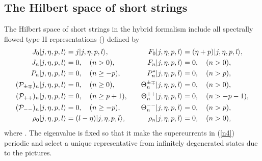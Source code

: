 \documentclass[a4paper,seceq,preprint]{ptptex}
\begin{document}
\subsection{The Hilbert space of short strings}\label{short}

The Hilbert space of short strings in the hybrid formalism include
all spectrally flowed type II representations\cite{KK} (\coordHE{})
defined by
\begin{alignat}{2}
 J_0|j,\eta,p,l\rangle&=j|j,\eta,p,l\rangle,&\qquad
 F_0|j,\eta,p,l\rangle&=(\eta+p)|j,\eta,p,l\rangle,\nonumber\\
 J_n|j,\eta,p,l\rangle&=0,\quad (n>0),&\quad
 F_n|j,\eta,p,l\rangle&=0,\quad (n>0),\nonumber\\
 P_n|j,\eta,p,l\rangle&=0,\quad (n\ge-p),&\quad
 P^*_n|j,\eta,p,l\rangle&=0,\quad (n>p),\nonumber\\
 ({\cal P}_{\pm\mp})_n|j,\eta,p,l\rangle&=0,\quad (n\ge0),&\quad
 \Theta^{\pm\mp}_n|j,\eta,p,l\rangle&=0,\quad (n>0),\nonumber\\
 ({\cal P}_{++})_n|j,\eta,p,l\rangle&=0,\quad (n\ge p+1),&\quad
 \Theta^{++}_n|j,\eta,p,l\rangle&=0,\quad (n>-p-1),\nonumber\\
 ({\cal P}_{--})_n|j,\eta,p,l\rangle&=0,\quad (n\ge-p),&\quad
 \Theta^{--}_n|j,\eta,p,l\rangle&=0,\quad (n>p),\nonumber\\
 \rho_0|j,\eta,p,l\rangle&=(l-\eta)|j,\eta,p,l\rangle,&\quad
 \rho_n|j,\eta,p,l\rangle&=0,\quad (n>0),
\label{typeii}
\end{alignat}
where \coordHE{}. The \coordHE{} eigenvalue is fixed so that 
it make the supercurrents \coordHE{} in (\ref{n4}) periodic
and select a unique representative from infinitely 
degenerated states due to the pictures. 
\end{document}
